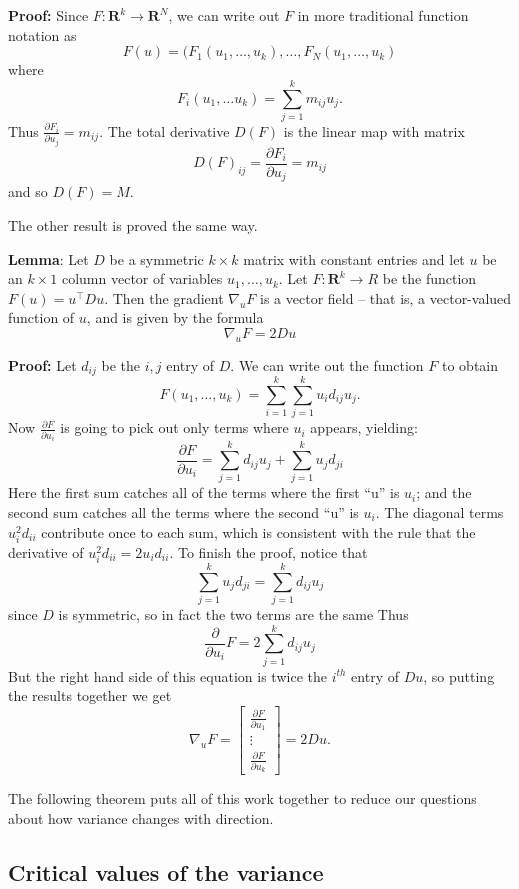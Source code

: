 \documentclass[
  11pt,
  letterpaper,
]{scrbook}
\theoremstyle{plain}
\theoremstyle{remark}
\begin{document}
\textbf{Proof:} Since \(F:\mathbf{R}^{k}\to\mathbf{R}^{N}\), we can
write out \(F\) in more traditional function notation as \[
F(u) = (F_{1}(u_1,\ldots, u_k), \ldots, F_{N}(u_1,\ldots, u_{k})
\] where \[
F_{i}(u_1,\ldots u_k) = \sum_{j=1}^{k} m_{ij}u_{j}.
\] Thus \(\frac{\partial F_{i}}{\partial u_{j}} = m_{ij}\). The total
derivative \(D(F)\) is the linear map with matrix \[
D(F)_{ij} = \frac{\partial F_{i}}{\partial u_{j}} = m_{ij}
\] and so \(D(F)=M\).

The other result is proved the same way.

\textbf{Lemma}: Let \(D\) be a symmetric \(k\times k\) matrix with
constant entries and let \(u\) be an \(k\times 1\) column vector of
variables \(u_{1},\ldots, u_{k}\). Let \(F:\mathbf{R}^{k}\to R\) be the
function \(F(u) = u^{\intercal}Du\). Then the gradient \(\nabla_{u} F\)
is a vector field -- that is, a vector-valued function of \(u\), and is
given by the formula \[
\nabla_{u} F = 2Du
\]

\textbf{Proof:} Let \(d_{ij}\) be the \(i,j\) entry of \(D\). We can
write out the function \(F\) to obtain \[
F(u_1,\ldots, u_{k}) = \sum_{i=1}^{k} \sum_{j=1}^{k} u_i d_{ij} u_j.
\] Now \(\frac{\partial F}{\partial u_{i}}\) is going to pick out only
terms where \(u_{i}\) appears, yielding: \[
\frac{\partial F}{\partial u_{i}} = \sum_{j=1}^{k} d_{ij}u_{j} + \sum_{j=1}^{k} u_{j}d_{ji}
\] Here the first sum catches all of the terms where the first ``u'' is
\(u_{i}\); and the second sum catches all the terms where the second
``u'' is \(u_{i}\). The diagonal terms \(u_{i}^2d_{ii}\) contribute once
to each sum, which is consistent with the rule that the derivative of
\(u_{i}^2d_{ii} = 2u_{i}d_{ii}\). To finish the proof, notice that \[
\sum_{j=1}^{k} u_{j}d_{ji} = \sum_{j=1}^{k} d_{ij}u_{j}
\] since \(D\) is symmetric, so in fact the two terms are the same Thus
\[
\frac{\partial}{\partial u_i}F = 2\sum_{j=1}^{k} d_{ij}u_{j}
\] But the right hand side of this equation is twice the \(i^{th}\)
entry of \(Du\), so putting the results together we get \[
\nabla_{u}F = \left[\begin{matrix} \frac{\partial F}{\partial u_{1}} \\ \vdots \\ \frac{\partial F}{\partial u_{k}}\end{matrix}\right] = 2Du.
\]

The following theorem puts all of this work together to reduce our
questions about how variance changes with direction.

\hypertarget{sec-critvals}{%
\subsection{Critical values of the variance}\label{sec-critvals}}
\end{document}
